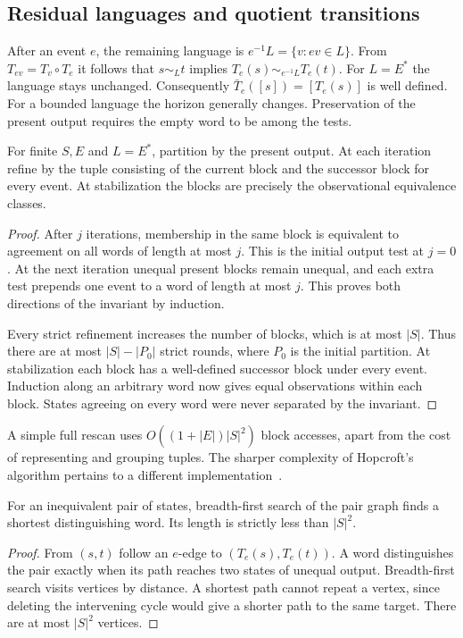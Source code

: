 \subsection{Residual languages and quotient transitions}
After an event $e$, the remaining language is $e^{-1}L=\{v:ev\in L\}$. From $T_{ev}=T_v\circ T_e$ it follows that $s\sim_Lt$ implies $T_e(s)\sim_{e^{-1}L}T_e(t)$. For $L=E^*$ the language stays unchanged. Consequently $\bar T_e([s])=[T_e(s)]$ is well defined. For a bounded language the horizon generally changes. Preservation of the present output requires the empty word to be among the tests.

\begin{proposition}\label{prop:refinement}
For finite $S,E$ and $L=E^*$, partition by the present output. At each iteration refine by the tuple consisting of the current block and the successor block for every event. At stabilization the blocks are precisely the observational equivalence classes.
\end{proposition}
\begin{proof}
After $j$ iterations, membership in the same block is equivalent to agreement on all words of length at most $j$. This is the initial output test at $j=0$. At the next iteration unequal present blocks remain unequal, and each extra test prepends one event to a word of length at most $j$. This proves both directions of the invariant by induction.

Every strict refinement increases the number of blocks, which is at most $|S|$. Thus there are at most $|S|-|P_0|$ strict rounds, where $P_0$ is the initial partition. At stabilization each block has a well-defined successor block under every event. Induction along an arbitrary word now gives equal observations within each block. States agreeing on every word were never separated by the invariant.
\end{proof}
A simple full rescan uses $O((1+|E|)|S|^2)$ block accesses, apart from the cost of representing and grouping tuples. The sharper complexity of Hopcroft's algorithm pertains to a different implementation~\cite{hopcroft}.

\begin{proposition}\label{prop:witness}
For an inequivalent pair of states, breadth-first search of the pair graph finds a shortest distinguishing word. Its length is strictly less than $|S|^2$.
\end{proposition}
\begin{proof}
From $(s,t)$ follow an $e$-edge to $(T_e(s),T_e(t))$. A word distinguishes the pair exactly when its path reaches two states of unequal output. Breadth-first search visits vertices by distance. A shortest path cannot repeat a vertex, since deleting the intervening cycle would give a shorter path to the same target. There are at most $|S|^2$ vertices.
\end{proof}

